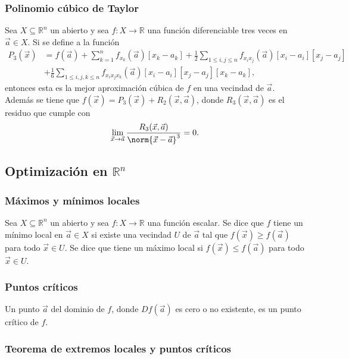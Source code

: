 \documentclass{article}
\begin{document}
\subsubsection*{Polinomio cúbico de Taylor}

Sea $X\subseteq\mathbb{R}^n$ un abierto y sea $f:X\to\mathbb{R}$ una función diferenciable tres veces en $\vec{a}\in X$. Si se define a la función 
\begin{align*}
P_3(\vec{x})&=f(\vec{a})+\sum_{k=1}^n f_{x_k}(\vec{a})[x_k-a_k]+\frac{1}{2}\sum_{1\leq i,j\leq n} f_{x_ix_j}(\vec{a})[x_i-a_i][x_j-a_j]\\
&+\frac{1}{6}\sum_{1\leq i,j,k\leq n}f_{x_ix_jx_k}(\vec{a})[x_i-a_i][x_j-a_j][x_k-a_k],
\end{align*}
entonces esta es la mejor aproximación cúbica de $f$ en una vecindad de $\vec{a}$. Además se tiene que $f(\vec{x})=P_3(\vec{x})+R_2(\vec{x},\vec{a})$, donde $R_3(\vec{x},\vec{a})$ es el residuo que cumple con
$$\lim_{\vec{x}\to\vec{a}}\frac{R_3(\vec{x},\vec{a})}{\norm{\vec{x}-\vec{a}}^3}=0.$$

\subsection*{Optimización en $\mathbb{R}^n$}

\subsubsection*{Máximos y mínimos locales}

Sea $X\subseteq\mathbb{R}^n$ un abierto y sea $f:X\to\mathbb{R}$ una función escalar. Se dice que $f$ tiene un mínimo local en $\vec{a}\in X$ si existe una vecindad $U$ de $\vec{a}$ tal que $f(\vec{x})\geq f(\vec{a})$ para todo $\vec{x}\in U$. Se dice que tiene un máximo local si $f(\vec{x})\leq f(\vec{a})$ para todo $\vec{x}\in U$.

\subsubsection*{Puntos críticos}

Un punto $\vec{a}$ del dominio de $f$, donde $Df(\vec{a})$ es cero o no existente, es un punto crítico de $f$.

\subsubsection*{Teorema de extremos locales y puntos críticos}
\end{document}
